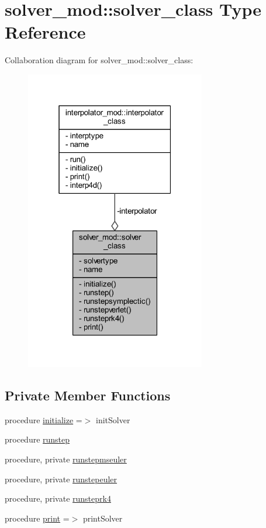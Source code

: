 \hypertarget{structsolver__mod_1_1solver__class}{}\section{solver\+\_\+mod\+:\+:solver\+\_\+class Type Reference}
\label{structsolver__mod_1_1solver__class}


Collaboration diagram for solver\+\_\+mod\+:\+:solver\+\_\+class\+:\nopagebreak
\begin{figure}[H]
\begin{center}
\leavevmode
\includegraphics[width=223pt]{structsolver__mod_1_1solver__class__coll__graph}
\end{center}
\end{figure}
\subsection*{Private Member Functions}
\begin{DoxyCompactItemize}
\item 
procedure \mbox{\hyperlink{structsolver__mod_1_1solver__class_a9ac72acd3e4fbb8881c7eaabe9e3d585}{initialize}} =$>$ init\+Solver
\item 
procedure \mbox{\hyperlink{structsolver__mod_1_1solver__class_a54ee0f169b626d3fb484d79cce91c3be}{runstep}}
\item 
procedure, private \mbox{\hyperlink{structsolver__mod_1_1solver__class_ac8048d91cd5b808369a84f08f63feb7d}{runstepmseuler}}
\item 
procedure, private \mbox{\hyperlink{structsolver__mod_1_1solver__class_a74396adb5f6525ecd691ff70912ee35e}{runstepeuler}}
\item 
procedure, private \mbox{\hyperlink{structsolver__mod_1_1solver__class_a58c86ed273b0b9141e74cc55b59377a3}{runsteprk4}}
\item 
procedure \mbox{\hyperlink{structsolver__mod_1_1solver__class_ac61135f89371079744ac9b5fd8da8a41}{print}} =$>$ print\+Solver
\end{DoxyCompactItemize}
